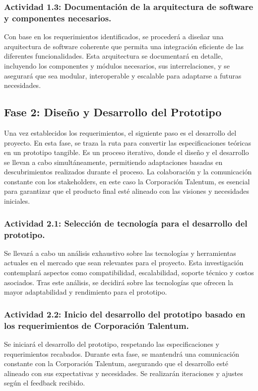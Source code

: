 \subsubsection{Actividad 1.3: Documentación de la arquitectura de software y componentes necesarios.}
Con base en los requerimientos identificados, se procederá a diseñar una arquitectura de software coherente que permita una integración eficiente de las diferentes funcionalidades. Esta arquitectura se documentará en detalle, incluyendo los componentes y módulos necesarios, sus interrelaciones, y se asegurará que sea modular, interoperable y escalable para adaptarse a futuras necesidades.

\subsection{Fase 2: Diseño y Desarrollo del Prototipo}
Una vez establecidos los requerimientos, el siguiente paso es el desarrollo del proyecto. En esta fase, se traza la ruta para convertir las especificaciones teóricas en un prototipo tangible. Es un proceso iterativo, donde el diseño y el desarrollo se llevan a cabo simultáneamente, permitiendo adaptaciones basadas en descubrimientos realizados durante el proceso. La colaboración y la comunicación constante con los stakeholders, en este caso la Corporación Talentum, es esencial para garantizar que el producto final esté alineado con las visiones y necesidades iniciales.

\subsubsection{Actividad 2.1: Selección de tecnología para el desarrollo del prototipo.}
Se llevará a cabo un análisis exhaustivo sobre las tecnologías y herramientas actuales en el mercado que sean relevantes para el proyecto. Esta investigación contemplará aspectos como compatibilidad, escalabilidad, soporte técnico y costos asociados. Tras este análisis, se decidirá sobre las tecnologías que ofrecen la mayor adaptabilidad y rendimiento para el prototipo.

\subsubsection{Actividad 2.2: Inicio del desarrollo del prototipo basado en los requerimientos de Corporación Talentum.}
Se iniciará el desarrollo del prototipo, respetando las especificaciones y requerimientos recabados. Durante esta fase, se mantendrá una comunicación constante con la Corporación Talentum, asegurando que el desarrollo esté alineado con sus expectativas y necesidades. Se realizarán iteraciones y ajustes según el feedback recibido.

